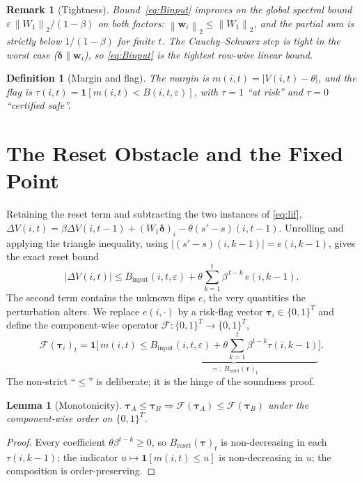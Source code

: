 \documentclass[10pt,twocolumn]{article}
\newtheorem{lemma}{Lemma}
\newtheorem{definition}{Definition}
\newtheorem{remark}{Remark}
\newcommand{\norm}[1]{\left\lVert #1 \right\rVert}
\newcommand{\abs}[1]{\left\lvert #1 \right\rvert}
\newcommand{\ind}{\mathbf{1}}
\newcommand{\eps}{\varepsilon}
\newcommand{\F}{\mathcal{F}}
\newcommand{\Bin}{B_{\mathrm{input}}}
\newcommand{\Brst}{B_{\mathrm{reset}}}
\begin{document}
\begin{remark}[Tightness]\label{rem:tight}
Bound~\eqref{eq:Binput} improves on the global spectral bound
$\eps\,\norm{W_1}_2/(1-\beta)$ on both factors: $\norm{\bm{w}_i}_2\le\norm{W_1}_2$, and the
partial sum is strictly below $1/(1-\beta)$ for finite $t$. The Cauchy--Schwarz step is tight
in the worst case ($\bm{\delta}\parallel\bm{w}_i$), so \eqref{eq:Binput} is the tightest
row-wise linear bound.
\end{remark}

\begin{definition}[Margin and flag]\label{def:flag}
The margin is $m(i,t)=\abs{V(i,t)-\theta}$, and the flag is
$\tau(i,t)=\ind[m(i,t)<B(i,t,\eps)]$, with $\tau=1$ ``at risk'' and $\tau=0$ ``certified safe''.
\end{definition}

\section{The Reset Obstacle and the Fixed Point}
\label{sec:reset}

Retaining the reset term and subtracting the two instances of \eqref{eq:lif},
$\Delta V(i,t)=\beta\Delta V(i,t{-}1)+(W_1\bm{\delta})_i-\theta(s'-s)(i,t{-}1)$. Unrolling and
applying the triangle inequality, using $\abs{(s'-s)(i,k{-}1)}=e(i,k{-}1)$, gives the exact
reset bound
\begin{equation}
\abs{\Delta V(i,t)}\le \Bin(i,t,\eps)+\theta\sum_{k=1}^{t}\beta^{\,t-k}\,e(i,k{-}1).
\label{eq:reset-bound}
\end{equation}
The second term contains the unknown flips $e$, the very quantities the perturbation alters.
We replace $e(i,\cdot)$ by a risk-flag vector $\bm{\tau}_i\in\{0,1\}^T$ and define the
component-wise operator $\F:\{0,1\}^T\!\to\{0,1\}^T$,
\begin{equation}
\F(\bm{\tau}_i)_t=\ind\!\Big[\,m(i,t)\le
\underbrace{\Bin(i,t,\eps)+\theta\!\sum_{k=1}^t\!\beta^{t-k}\tau(i,k{-}1)}_{=:\ \Brst(\bm{\tau})_t}\Big].
\label{eq:F}
\end{equation}
The non-strict ``$\le$'' is deliberate; it is the hinge of the soundness proof.

\begin{lemma}[Monotonicity]\label{lem:mono}
$\bm{\tau}_A\le\bm{\tau}_B\Rightarrow\F(\bm{\tau}_A)\le\F(\bm{\tau}_B)$ under the
component-wise order on $\{0,1\}^T$.
\end{lemma}
\begin{proof}
Every coefficient $\theta\beta^{t-k}\ge0$, so $\Brst(\bm{\tau})_t$ is non-decreasing in each
$\tau(i,k{-}1)$; the indicator $u\mapsto\ind[m(i,t)\le u]$ is non-decreasing in $u$; the
composition is order-preserving.
\end{proof}
\end{document}
